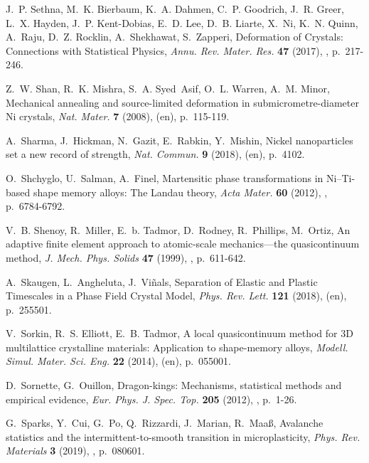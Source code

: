 \documentclass[CRPHYS,Unicode,manuscript]{cedram}
\begin{document}
\begin{thebibliography}{100}
J.~P. Sethna, M.~K. Bierbaum, K.~A. Dahmen, C.~P. Goodrich, J.~R. Greer, L.~X.
  Hayden, J.~P. Kent-Dobias, E.~D. Lee, D.~B. Liarte, X.~Ni, K.~N. Quinn,
  A.~Raju, D.~Z. Rocklin, A.~Shekhawat, S.~Zapperi, {\og Deformation of
  Crystals: Connections with Statistical Physics\fg}, \emph{Annu. Rev. Mater.
  Res.} \textbf{47} (2017), , p.~217-246.

Z.~W. Shan, R.~K. Mishra, S.~A. Syed~Asif, O.~L. Warren, A.~M. Minor, {\og
  Mechanical annealing and source-limited deformation in submicrometre-diameter
  Ni crystals\fg}, \emph{Nat. Mater.} \textbf{7} (2008),  (en),
  p.~115-119.

A.~Sharma, J.~Hickman, N.~Gazit, E.~Rabkin, Y.~Mishin, {\og Nickel
  nanoparticles set a new record of strength\fg}, \emph{Nat. Commun.}
  \textbf{9} (2018),  (en), p.~4102.

O.~Shchyglo, U.~Salman, A.~Finel, {\og Martensitic phase transformations in
  {Ni--Ti-based} shape memory alloys: The Landau theory\fg}, \emph{Acta Mater.}
  \textbf{60} (2012), , p.~6784-6792.

V.~B. Shenoy, R.~Miller, E.~b. Tadmor, D.~Rodney, R.~Phillips, M.~Ortiz, {\og
  An adaptive finite element approach to atomic-scale mechanics---the
  quasicontinuum method\fg}, \emph{J. Mech. Phys. Solids} \textbf{47} (1999),
  , p.~611-642.

A.~Skaugen, L.~Angheluta, J.~Vi{\~n}als, {\og Separation of Elastic and Plastic
  Timescales in a Phase Field Crystal Model\fg}, \emph{Phys. Rev. Lett.}
  \textbf{121} (2018),  (en), p.~255501.

V.~Sorkin, R.~S. Elliott, E.~B. Tadmor, {\og A local quasicontinuum method for
  {3D} multilattice crystalline materials: Application to shape-memory
  alloys\fg}, \emph{Modell. Simul. Mater. Sci. Eng.} \textbf{22} (2014),
   (en), p.~055001.

D.~Sornette, G.~Ouillon, {\og Dragon-kings: Mechanisms, statistical methods and
  empirical evidence\fg}, \emph{Eur. Phys. J. Spec. Top.} \textbf{205} (2012),
  , p.~1-26.

G.~Sparks, Y.~Cui, G.~Po, Q.~Rizzardi, J.~Marian, R.~Maa{\ss}, {\og Avalanche
  statistics and the intermittent-to-smooth transition in microplasticity\fg},
  \emph{Phys. Rev. Materials} \textbf{3} (2019), , p.~080601.


\end{thebibliography}
\end{document}
